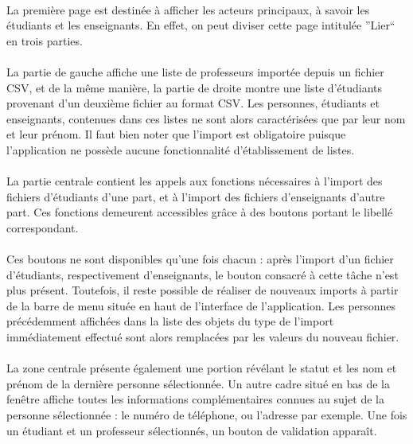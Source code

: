 \documentclass[a4paper,10pt]{report}
\begin{document}
	  
	  
	    \paragraph{}
	      La première page est destinée à afficher les acteurs principaux, à savoir les étudiants et les enseignants. 
	      En effet, on peut diviser cette page intitulée ''Lier`` en trois parties.
	      
	    \paragraph{}
	      La partie de gauche affiche une liste de professeurs importée depuis un fichier CSV, et de la même manière, la partie de droite montre une liste d'étudiants provenant d'un deuxième fichier au format CSV.
	      Les personnes, étudiants et enseignants, contenues dans ces listes ne sont alors caractérisées que par leur nom et leur prénom.
	      Il faut bien noter que l'import est obligatoire puisque l'application ne possède aucune fonctionnalité d'établissement de listes.
	    
	    \paragraph{}
	      La partie centrale contient les appels aux fonctions nécessaires à l'import des fichiers d'étudiants d'une part, et à l'import des fichiers d'enseignants d'autre part.
	      Ces fonctions demeurent accessibles grâce à des boutons portant le libellé correspondant.
	     
	    \paragraph{}  
	      Ces boutons ne sont disponibles qu'une fois chacun : après l'import d'un fichier d'étudiants, respectivement d'enseignants, le bouton consacré à cette tâche n'est plus présent.
	      Toutefois, il reste possible de réaliser de nouveaux imports à partir de la barre de menu située en haut de l'interface de l'application.
	      Les personnes précédemment affichées dans la liste des objets du type de l'import immédiatement effectué sont alors remplacées par les valeurs du nouveau fichier.  
	      
	    \paragraph{}      
	      La zone centrale présente également une portion révélant le statut et les nom et prénom de la dernière personne sélectionnée.
	      Un autre cadre situé en bas de la fenêtre affiche toutes les informations complémentaires connues au sujet de la personne sélectionnée : le numéro de téléphone, ou l'adresse par exemple.
	      Une fois un étudiant et un professeur sélectionnés, un bouton de validation apparaît.
	    
\end{document}
